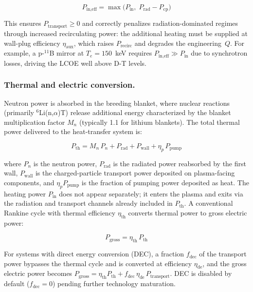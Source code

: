 \documentclass{article}
\begin{document}
\begin{equation}
\label{eq:p-input-eff}
P_{\text{in,eff}} = \max\!\bigl(P_{\text{in}},\;
  P_{\text{rad}} - P_{\text{cp}}\bigr)
\end{equation}

\noindent This ensures $P_{\text{transport}} \geq 0$ and correctly
penalizes radiation-dominated regimes through increased recirculating
power: the additional heating must be supplied at wall-plug efficiency
$\eta_{\text{aux}}$, which raises $P_{\text{recirc}}$ and degrades the
engineering~$Q$. For example, a p-${}^{11}$B mirror at
$T_e = 150$~keV requires $P_{\text{in,eff}} \gg P_{\text{in}}$ due to
synchrotron losses, driving the LCOE well above D-T levels.

\subsubsection{Thermal and electric conversion.}

Neutron power is absorbed in the breeding blanket, where nuclear
reactions (primarily ${}^6$Li(n,$\alpha$)T) release additional energy
characterized by the blanket multiplication factor $M_n$ (typically
1.1 for lithium blankets). The total thermal power delivered to the
heat-transfer system is:

\begin{equation}
\label{eq:p-thermal}
P_{\text{th}} = M_n \, P_n + P_{\text{rad}} + P_{\text{wall}}
              + \eta_p \, P_{\text{pump}}
\end{equation}

\noindent where $P_n$ is the neutron power, $P_{\text{rad}}$ is the
radiated power reabsorbed by the first wall, $P_{\text{wall}}$ is the
charged-particle transport power deposited on plasma-facing components,
and $\eta_p P_{\text{pump}}$ is the fraction of pumping power deposited
as heat. The heating power $P_{\text{in}}$ does not appear
separately; it enters the plasma and exits via the radiation and
transport channels already included in $P_{\text{th}}$.
A conventional Rankine cycle with thermal efficiency $\eta_{\text{th}}$
converts thermal power to gross electric power:

\begin{equation}
\label{eq:p-gross}
P_{\text{gross}} = \eta_{\text{th}} \, P_{\text{th}}
\end{equation}

\noindent For systems with direct energy conversion (DEC), a fraction
$f_{\text{dec}}$ of the transport power bypasses the
thermal cycle and is converted at efficiency $\eta_{\text{de}}$, and
the gross electric power becomes
$P_{\text{gross}} = \eta_{\text{th}} P_{\text{th}} +
 f_{\text{dec}} \, \eta_{\text{de}} \, P_{\text{transport}}$.
DEC is disabled by default ($f_{\text{dec}} = 0$) pending further
technology maturation.
\end{document}
